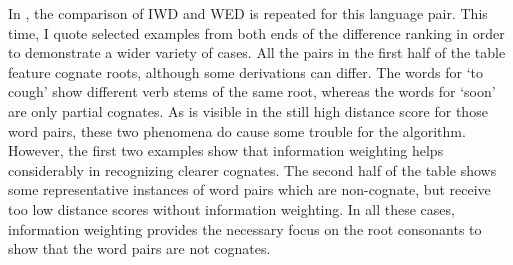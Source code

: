 In , the comparison of IWD and WED is repeated for this language pair. This time, I quote selected examples from both ends of the difference ranking in order to demonstrate a wider variety of cases. All the pairs in the first half of the table feature cognate roots, although some derivations can differ. The words for `to cough' show different verb stems of the same root, whereas the words for `soon' are only partial cognates. As is visible in the still high distance score for those word pairs, these two phenomena do cause some trouble for the algorithm. However, the first two examples show that information weighting helps considerably in recognizing clearer cognates. The second half of the table shows some representative instances of word pairs which are non-cognate, but receive too low distance scores without information weighting. In all these cases, information weighting provides the necessary focus on the root consonants to show that the word pairs are not cognates.


\begin{table}
\centering
{}
\caption{Comparison of normalized weighted string distances on Arabic and Hebrew}
\label{iwsa-ranking-ara-heb}
\end{table}

